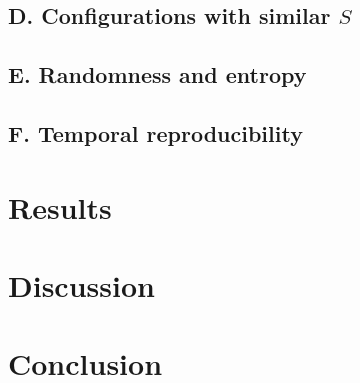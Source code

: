 \documentclass[aps,prx,twocolumn,superscriptaddress,nofootinbib]{revtex4-2}
\begin{document}
\subsection{D. Configurations with similar $S$}
\subsection{E. Randomness and entropy}
\subsection{F. Temporal reproducibility}

\section{Results}

\section{Discussion}

\section{Conclusion}


\end{document}
